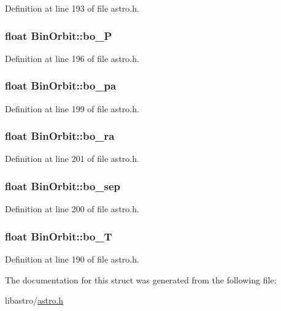 Definition at line 193 of file astro.\-h.

\hypertarget{struct_bin_orbit_ada0bcef01f07cd152cf994e004276b25}{
\subsubsection[{bo\-\_\-\-P}]{\setlength{\rightskip}{0pt plus 5cm}float Bin\-Orbit\-::bo\-\_\-\-P}}\label{struct_bin_orbit_ada0bcef01f07cd152cf994e004276b25}


Definition at line 196 of file astro.\-h.

\hypertarget{struct_bin_orbit_ad3fedf474fce6b3a979767b6e87bcf89}{
\subsubsection[{bo\-\_\-pa}]{\setlength{\rightskip}{0pt plus 5cm}float Bin\-Orbit\-::bo\-\_\-pa}}\label{struct_bin_orbit_ad3fedf474fce6b3a979767b6e87bcf89}


Definition at line 199 of file astro.\-h.

\hypertarget{struct_bin_orbit_a1d4a15be4410fce37882ba20ba589af0}{
\subsubsection[{bo\-\_\-ra}]{\setlength{\rightskip}{0pt plus 5cm}float Bin\-Orbit\-::bo\-\_\-ra}}\label{struct_bin_orbit_a1d4a15be4410fce37882ba20ba589af0}


Definition at line 201 of file astro.\-h.

\hypertarget{struct_bin_orbit_afbdda06daa8e30a7737c039351262e99}{
\subsubsection[{bo\-\_\-sep}]{\setlength{\rightskip}{0pt plus 5cm}float Bin\-Orbit\-::bo\-\_\-sep}}\label{struct_bin_orbit_afbdda06daa8e30a7737c039351262e99}


Definition at line 200 of file astro.\-h.

\hypertarget{struct_bin_orbit_a13a14fdb480f7e64a11a574f6c3a4c74}{
\subsubsection[{bo\-\_\-\-T}]{\setlength{\rightskip}{0pt plus 5cm}float Bin\-Orbit\-::bo\-\_\-\-T}}\label{struct_bin_orbit_a13a14fdb480f7e64a11a574f6c3a4c74}


Definition at line 190 of file astro.\-h.



The documentation for this struct was generated from the following file\-:\begin{DoxyCompactItemize}
\item 
libastro/\hyperlink{astro_8h}{astro.\-h}\end{DoxyCompactItemize}
